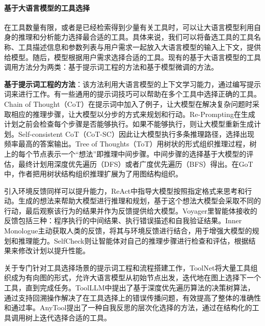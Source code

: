 \paragraph{基于大语言模型的工具选择} 

在工具数量有限，或者是已经检索得到少量有关工具时，可以让大语言模型利用自身的推理和分析能力选择最合适的工具。具体来说，我们可以将备选工具的工具名称、工具描述信息和参数列表与用户需求一起放入大语言模型的输入上下文，提供给模型。随后，模型根据用户需求选择合适的工具。现有的基于大语言模型的工具调用方法分为两类：基于提示词工程的方法和基于模型微调的方法。

\textbf{基于提示词工程的方法}：该方法利用大语言模型的上下文学习能力，通过编写提示词来进行工作。有一些通用的提示词技巧可以帮助在多个工具中选择正确的工具。Chain of Thought（CoT）\cite{Wang2023a}在提示词中加入了例子，让大模型在解决复杂问题时采取相应的推理步骤，让大模型以分步的方式来规划和行动。Re-Prompting\cite{Raman2022}在生成计划之前会检查每个步骤是否能够执行。如果不能够执行，则让大模型重新生成计划。Self-consistent CoT（CoT-SC）\cite{wang2022self}因此让大模型执行多条推理路径，选择出现频率最高的答案输出。Tree of Thoughts（ToT）\cite{Yao2023a}用树状的形式组织推理过程，树上的每个节点表示一个“想法”即推理中间步骤。中间步骤的选择基于大模型的评估，最终计划用深度优先遍历（DFS）或者广度优先遍历（BFS）得出。在GoT\cite{Besta2023}中，作者把用树状结构组织推理扩展为了用图结构组织。

引入环境反馈同样可以提升能力，ReAct\cite{Yao2023b}中指导大模型按照指定格式来思考和行动。生成的想法来帮助大模型进行推理和规划，基于这个想法大模型会采取不同的行动，最后观察该行为的结果并作为反馈提供给大模型。Voyager\cite{Wang2023b}里智能体接收的反馈包括三种：程序执行的中间结果、执行错误描述和自我验证结果。Inner Monologue\cite{Huang2022}主动获取人类的反馈，将其与环境反馈进行结合，用于增强大模型的规划和推理能力。SelfCheck\cite{Miao2023}则让智能体对自己的推理步骤进行检查和评估，根据结果来修改计划以提升性能。

关于专门针对工具选择场景的提示词工程和流程搭建工作，ToolNet\cite{Liu2024}将大量工具组织成为有向图的形式，允许大语言模型从初始节点出发，迭代地在图上选择下一个工具，直到完成任务。ToolLLM\cite{Qin2023}中提出了基于深度优先遍历算法的决策树算法，通过支持回溯操作解决了在工具选择上的错误传播问题，有效提高了整体的准确性和通过率。AnyTool\cite{Du2024}提出了一种自我反思的层次化选择的方法，通过在结构化的工具调用树上迭代选择合适的工具。

